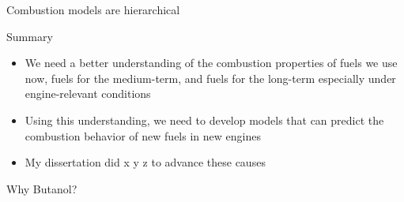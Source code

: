 \documentclass{beamer}
\begin{document}
\begin{frame}{Combustion models are hierarchical}
{    }
\end{frame}

\begin{frame}{Summary}
    \begin{itemize}
        \item We need a better understanding of the combustion properties of fuels we use now, fuels for the medium-term, and fuels for the long-term especially under engine-relevant conditions
        \item Using this understanding, we need to develop models that can predict the combustion behavior of new fuels in new engines
        \item My dissertation did x y z to advance these causes
    \end{itemize}
\end{frame}

\begin{frame}{Why Butanol?}
\end{frame}
\end{document}
